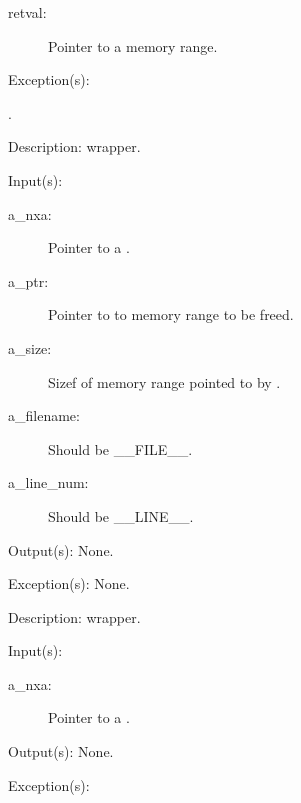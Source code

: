 \begin{capi}
\begin{capilist}
\begin{description}
		\item[retval: ]
			Pointer to a memory range.
		\end{description}
	\item[Exception(s): ]
		\begin{description}\item[]
		\item[.]
		\end{description}
	\item[Description: ]
		 wrapper.
	\end{capilist}
\label{nxa_free_e}
\label{nxa_free}
	\begin{capilist}
	\item[Input(s): ]
		\begin{description}\item[]
		\item[a\_nxa: ]
			Pointer to a .
		\item[a\_ptr: ]
			Pointer to to memory range to be freed.
		\item[a\_size: ]
			Sizef of memory range pointed to by .
		\item[a\_filename: ]
			Should be \_\_FILE\_\_.
		\item[a\_line\_num: ]
			Should be \_\_LINE\_\_.
		\end{description}
	\item[Output(s): ] None.
	\item[Exception(s): ] None.
	\item[Description: ]
		 wrapper.
	\end{capilist}
\label{nxa_collect}
	\begin{capilist}
	\item[Input(s): ]
		\begin{description}\item[]
		\item[a\_nxa: ]
			Pointer to a \classname{nxa}.
		\end{description}
	\item[Output(s): ] None.
	\item[Exception(s): ]

\end{capilist}
\end{capi}
